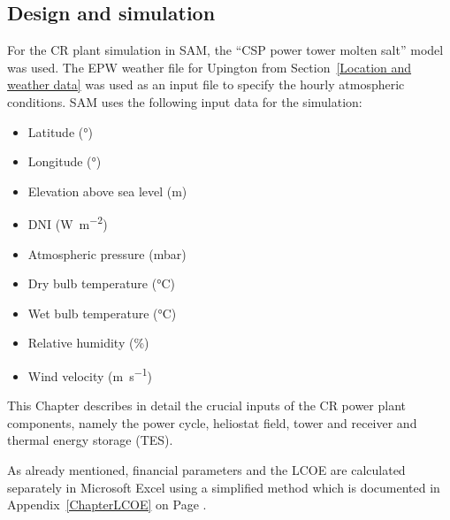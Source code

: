 \subsection{Design  and simulation} \label{CR power plant design  and simulation}
For the CR plant simulation in SAM, the \enquote{CSP power tower molten salt} model was used. The EPW weather file for Upington from Section~\ref{Location and weather data} was used as an input file to specify the hourly atmospheric conditions. SAM uses the following input data for the simulation:
\begin{itemize}
\item Latitude (\si{\degree})
\item Longitude (\si{\degree})
\item Elevation above sea level (\si{\metre})
\item DNI (\si{\watt\per\square\metre})
\item Atmospheric pressure (\si{\milli\bar})
\item Dry bulb temperature (\si{\celsius})
\item Wet bulb temperature (\si{\celsius})
\item Relative humidity (\si{\percent})
\item Wind velocity (\si{\metre\per\second})
\end{itemize}
This Chapter describes in detail the crucial inputs of the CR power plant components, namely the power cycle, heliostat field, tower and receiver and thermal energy storage (TES).

As already mentioned, financial parameters and the LCOE are calculated separately in Microsoft Excel using a simplified method which is documented in Appendix~\ref{ChapterLCOE} on Page \pageref{ChapterLCOE}.

